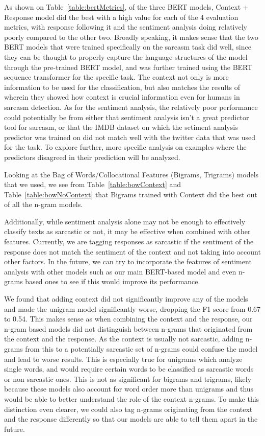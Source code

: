 \documentclass[11pt,a4paper]{article}
\begin{document}
As shown on Table~\ref{table:bertMetrics}, of the three BERT models,
Context + Response model did the best with a high value for each of the 4 evaluation metrics, with response following it and the sentiment analysis doing relatively poorly compared to the
other two. Broadly speaking, it makes sense that the two BERT models that were trained specifically on the sarcasm task did well, since they can be thought to properly capture the
language structures of the model through the pre-trained BERT model, and was further trained using the BERT sequence transformer for the specific task. The context not only is more
information to be used for the classification, but also matches the results of \cite{Wallace2014HumansRC} wherein they showed how context is crucial information even for humans in
sarcasm detection. As for the sentiment analysis, the relatively poor performance could potentially be from either that sentiment analysis isn’t a great predictor tool for sarcasm,
or that the IMDB dataset on which the setiment analysis predictor was trained on did not match well with the twitter data that was used for the task. To explore further, more specific
analysis on examples where the predictors disagreed in their prediction will be analyzed.


Looking at the Bag of Words/Collocational Features (Bigrams, Trigrams) models that we used, we see from Table~\ref{table:bowContext} and Table~\ref{table:bowNoContext} that Bigrams trained with Context did the best
out of all the n-gram models. 

Additionally, while sentiment analysis alone may not be enough to effectively classify texts as sarcastic or not, it may be effective when combined with other features. Currently,
we are tagging responses as sarcastic if the sentiment of the response does not match the sentiment of the context and not taking into account other factors. In the future, we can try to incorporate the features of sentiment analysis with other models such as our main
BERT-based model and even n-grams based ones to see if this would improve its performance.

We found that adding context did not significantly improve any of the models and made the unigram model significantly worse, dropping the F1 score from 0.67 to 0.54. This makes
sense as when combining the context and the response, our n-gram based models did not distinguish between n-grams that originated from the context and the response. As the context
is usually not sarcastic, adding n-grams from this to a potentially sarcastic set of n-grams could confuse the model and lead to worse results. This is especially true for unigrams
which analyze single words, and would require certain words to be classified as sarcastic words or non sarcastic ones. This is not as significant for bigrams and trigrams, likely
because these models also account for word order more than unigrams and thus would be able to better understand the role of the context n-grams. To make this distinction even
clearer, we could also tag n-grams originating from the context and the response differently so that our models are able to tell them apart in the future.
\end{document}
